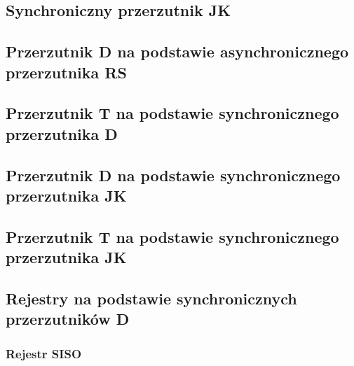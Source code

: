 \documentclass[12pt,a4paper]{article}
\begin{document}
\subsection{Synchroniczny przerzutnik JK}



\subsection{Przerzutnik D na podstawie asynchronicznego przerzutnika RS}

\subsection{Przerzutnik T na podstawie synchronicznego przerzutnika D}

\subsection{Przerzutnik D na podstawie synchronicznego przerzutnika JK}

\subsection{Przerzutnik T na podstawie synchronicznego przerzutnika JK}

\subsection{Rejestry na podstawie synchronicznych przerzutników D}
\subsubsection{Rejestr SISO}
\end{document}
